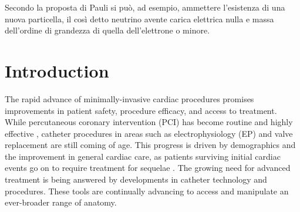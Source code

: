 \begin{savequote}[8cm]
 Secondo la proposta di Pauli si può, ad esempio, ammettere l'esistenza di una nuova particella, il così detto neutrino avente carica elettrica nulla e massa dell'ordine di grandezza di quella dell'elettrone o minore.
\end{savequote}

\chapter{\label{ch:1-intro}Introduction} 


The rapid advance of minimally-invasive cardiac procedures promises improvements in patient safety, procedure efficacy, and access to treatment.  While percutaneous coronary intervention (PCI) has become routine and highly effective , catheter procedures in areas such as electrophysiology (EP) and valve replacement are still coming of age.  This progress is driven by demographics and the improvement in general cardiac care, as patients surviving initial cardiac events go on to require treatment for sequelae .  The growing need for advanced treatment is being answered by developments in catheter technology and procedures.  These tools are continually advancing to access and manipulate an ever-broader range of anatomy.
